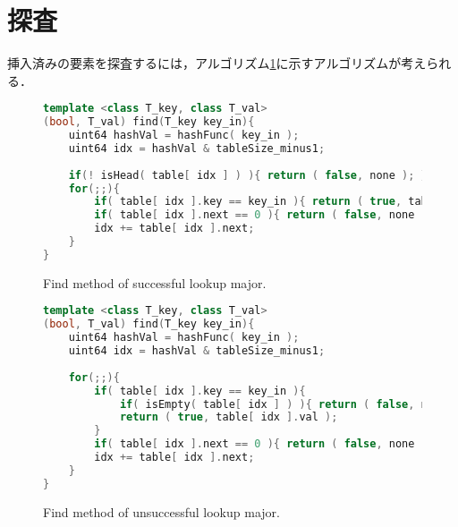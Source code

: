 \section{探査}
挿入済みの要素を探査するには，アルゴリズム\ref{alg_find_sm}に示すアルゴリズムが考えられる．

\begin{figure} %
\begin{lstlisting}[language=C++]
template <class T_key, class T_val>
(bool, T_val) find(T_key key_in){
	uint64 hashVal = hashFunc( key_in );
	uint64 idx = hashVal & tableSize_minus1;
	
	if(! isHead( table[ idx ] ) ){ return ( false, none ); }
	for(;;){
		if( table[ idx ].key == key_in ){ return ( true, table[ idx ].val ); }
		if( table[ idx ].next == 0 ){ return ( false, none ); }
		idx += table[ idx ].next;
	}
}
\end{lstlisting}
\caption{
  Find method of successful lookup major.
}
\label{alg_find_sm}
\end{figure}


\begin{figure}[] %
\begin{lstlisting}[language=C++]
template <class T_key, class T_val>
(bool, T_val) find(T_key key_in){
	uint64 hashVal = hashFunc( key_in );
	uint64 idx = hashVal & tableSize_minus1;
	
	for(;;){
		if( table[ idx ].key == key_in ){
			if( isEmpty( table[ idx ] ) ){ return ( false, none ); }
			return ( true, table[ idx ].val );
		}
		if( table[ idx ].next == 0 ){ return ( false, none ); }
		idx += table[ idx ].next;
	}
}
\end{lstlisting}
\caption{
  Find method of unsuccessful lookup major.
}
\label{alg_find_usm}
\end{figure}


